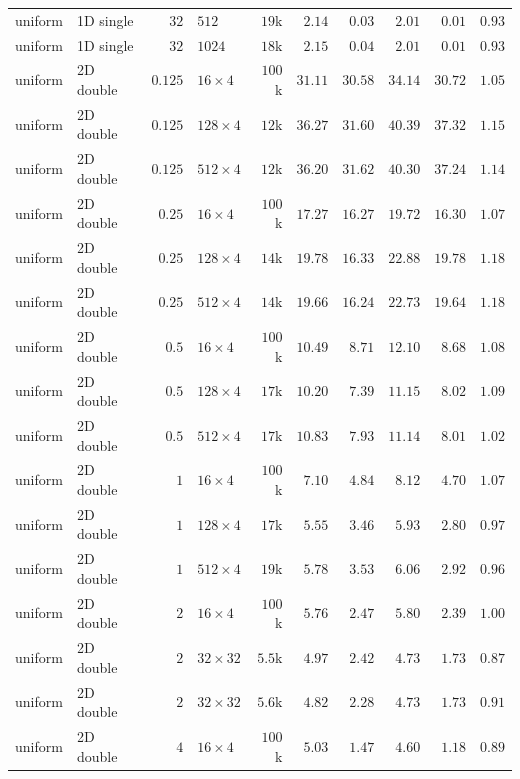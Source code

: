 {\begin{longtable}{llrlrrrrrr}
    uniform & 1D single & $32$ & $512$ & $19$k & $2.14$ & $0.03$ & $2.01$ & $0.01$ & $0.93$ \\
    uniform & 1D single & $32$ & $1024$ & $18$k & $2.15$ & $0.04$ & $2.01$ & $0.01$ & $0.93$ \\
    \midrule
    uniform & 2D double & $0.125$ & $16{\times}4$ & $100$k & $31.11$ & $30.58$ & $34.14$ & $30.72$ & $1.05$ \\
    uniform & 2D double & $0.125$ & $128{\times}4$ & $12$k & $36.27$ & $31.60$ & $40.39$ & $37.32$ & $1.15$ \\
    uniform & 2D double & $0.125$ & $512{\times}4$ & $12$k & $36.20$ & $31.62$ & $40.30$ & $37.24$ & $1.14$ \\
    uniform & 2D double & $0.25$ & $16{\times}4$ & $100$k & $17.27$ & $16.27$ & $19.72$ & $16.30$ & $1.07$ \\
    uniform & 2D double & $0.25$ & $128{\times}4$ & $14$k & $19.78$ & $16.33$ & $22.88$ & $19.78$ & $1.18$ \\
    uniform & 2D double & $0.25$ & $512{\times}4$ & $14$k & $19.66$ & $16.24$ & $22.73$ & $19.64$ & $1.18$ \\
    uniform & 2D double & $0.5$ & $16{\times}4$ & $100$k & $10.49$ & $8.71$ & $12.10$ & $8.68$ & $1.08$ \\
    uniform & 2D double & $0.5$ & $128{\times}4$ & $17$k & $10.20$ & $7.39$ & $11.15$ & $8.02$ & $1.09$ \\
    uniform & 2D double & $0.5$ & $512{\times}4$ & $17$k & $10.83$ & $7.93$ & $11.14$ & $8.01$ & $1.02$ \\
    uniform & 2D double & $1$ & $16{\times}4$ & $100$k & $7.10$ & $4.84$ & $8.12$ & $4.70$ & $1.07$ \\
    uniform & 2D double & $1$ & $128{\times}4$ & $17$k & $5.55$ & $3.46$ & $5.93$ & $2.80$ & $0.97$ \\
    uniform & 2D double & $1$ & $512{\times}4$ & $19$k & $5.78$ & $3.53$ & $6.06$ & $2.92$ & $0.96$ \\
    uniform & 2D double & $2$ & $16{\times}4$ & $100$k & $5.76$ & $2.47$ & $5.80$ & $2.39$ & $1.00$ \\
    uniform & 2D double & $2$ & $32{\times}32$ & $5.5$k & $4.97$ & $2.42$ & $4.73$ & $1.73$ & $0.87$ \\
    uniform & 2D double & $2$ & $32{\times}32$ & $5.6$k & $4.82$ & $2.28$ & $4.73$ & $1.73$ & $0.91$ \\
    uniform & 2D double & $4$ & $16{\times}4$ & $100$k & $5.03$ & $1.47$ & $4.60$ & $1.18$ & $0.89$ \\

\end{longtable}}
